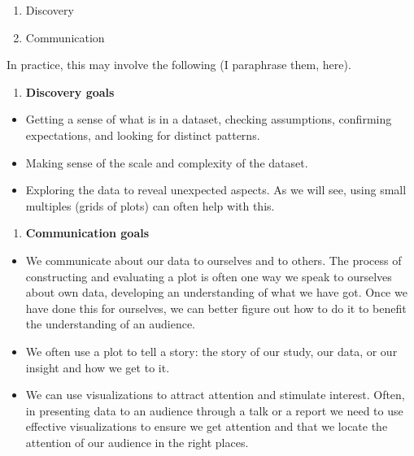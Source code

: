 \documentclass[
  letterpaper,
  DIV=11,
  numbers=noendperiod]{scrreprt}
\providecommand{\tightlist}{%
  \setlength{\itemsep}{0pt}\setlength{\parskip}{0pt}}\usepackage{longtable,booktabs,array}
\begin{document}
\begin{enumerate}
\def\labelenumi{\arabic{enumi}.}
\tightlist
\item
  Discovery
\item
  Communication
\end{enumerate}

In practice, this may involve the following (I paraphrase them, here).

\begin{enumerate}
\def\labelenumi{\arabic{enumi}.}
\tightlist
\item
  \textbf{Discovery goals}
\end{enumerate}

\begin{itemize}
\tightlist
\item
  Getting a sense of what is in a dataset, checking assumptions,
  confirming expectations, and looking for distinct patterns.
\item
  Making sense of the scale and complexity of the dataset.
\item
  Exploring the data to reveal unexpected aspects. As we will see, using
  small multiples (grids of plots) can often help with this.
\end{itemize}

\begin{enumerate}
\def\labelenumi{\arabic{enumi}.}
\setcounter{enumi}{1}
\tightlist
\item
  \textbf{Communication goals}
\end{enumerate}

\begin{itemize}
\tightlist
\item
  We communicate about our data to ourselves and to others. The process
  of constructing and evaluating a plot is often one way we speak to
  ourselves about own data, developing an understanding of what we have
  got. Once we have done this for ourselves, we can better figure out
  how to do it to benefit the understanding of an audience.
\item
  We often use a plot to tell a story: the story of our study, our data,
  or our insight and how we get to it.
\item
  We can use visualizations to attract attention and stimulate interest.
  Often, in presenting data to an audience through a talk or a report we
  need to use effective visualizations to ensure we get attention and
  that we locate the attention of our audience in the right places.
\end{itemize}
\end{document}
